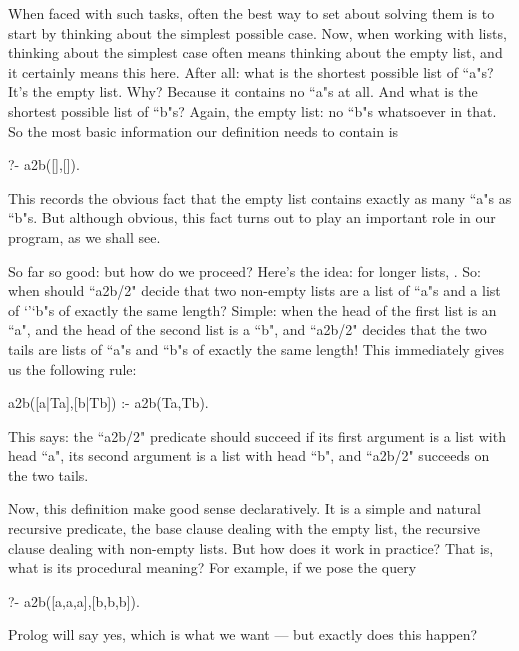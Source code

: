 When faced with such tasks, often the best way to set about solving
them is to start by thinking about the simplest possible case. Now,
when working with lists, thinking about the simplest case often means
thinking about the empty list, and it certainly means this here.
After all: what is the shortest possible list of ``a"s?  It's the empty
list. Why? Because it contains no ``a"s at all. And what is the
shortest possible list of ``b"s? Again, the empty list: no ``b"s
whatsoever in that.  So the most basic information our definition
needs to contain is
\begin{LPNcodedisplay}
?- a2b([],[]).
\end{LPNcodedisplay}
This records the obvious fact that the empty list contains exactly as
many ``a"s as ``b"s. But although obvious, this fact turns out
to play an important role in our program, as we shall see.

 So far so good: but how do we proceed? Here's the idea: for longer
lists, . So: when should ``a2b/2"
decide that two non-empty lists are a list of ``a"s and a list of
`'`b"s of exactly the same length? Simple: when the head of the
first list is an ``a", and the head of the second list is a
``b", and ``a2b/2" decides that the two tails are lists
of ``a"s and ``b"s of exactly the same length!  This
immediately gives us the following rule:
\begin{LPNcodedisplay}
a2b([a|Ta],[b|Tb]) :- a2b(Ta,Tb).
\end{LPNcodedisplay}
This says: the ``a2b/2" predicate should succeed if its
first argument is a list with head ``a", its second argument is a
list with head ``b", and ``a2b/2" succeeds on the two
tails.

Now, this definition make good sense declaratively. It is a simple and
natural recursive predicate, the base clause dealing with the empty
list, the recursive clause dealing with non-empty lists.  But how does
it work in practice? That is, what is its procedural meaning?  For
example, if we pose the query
\begin{LPNcodedisplay}
?- a2b([a,a,a],[b,b,b]).
\end{LPNcodedisplay}
Prolog will say yes, which is what we want --- but  exactly does
this happen?

